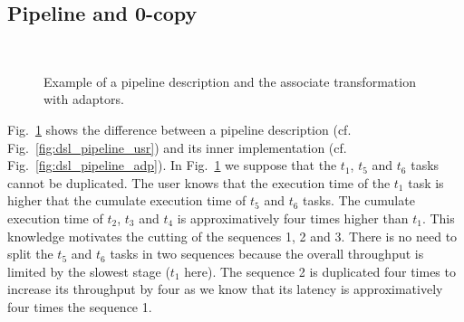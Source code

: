 \subsection{Pipeline and 0-copy}

\begin{figure}[htp]
  \centering
  \\
  \caption{Example of a pipeline description and the associate transformation with adaptors.}
  \label{fig:dsl_pipeline}
\end{figure}

Fig.~\ref{fig:dsl_pipeline} shows the difference between a pipeline description
(cf. Fig.~\ref{fig:dsl_pipeline_usr}) and its inner implementation (cf.
Fig.~\ref{fig:dsl_pipeline_adp}). In Fig.~\ref{fig:dsl_pipeline} we suppose
that the $t_1$, $t_5$ and $t_6$ tasks cannot be duplicated. The user knows that
the execution time of the $t_1$ task is higher that the cumulate execution time
of $t_5$ and $t_6$ tasks. The cumulate execution time of $t_2$, $t_3$ and $t_4$
is approximatively four times higher than $t_1$. This knowledge motivates the
cutting of the sequences 1, 2 and 3. There is no need to split the $t_5$ and
$t_6$ tasks in two sequences because the overall throughput is limited by the
slowest stage ($t_1$ here). The sequence 2 is duplicated four times to increase
its throughput by four as we know that its latency is approximatively four
times the sequence 1.


